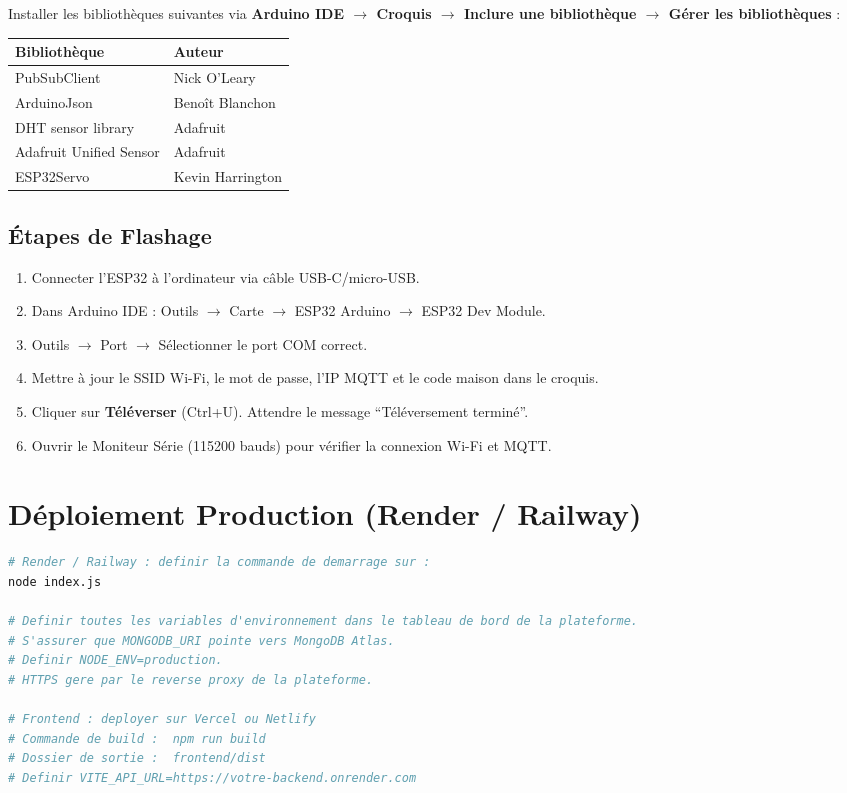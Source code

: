 Installer les bibliothèques suivantes via \textbf{Arduino IDE $\to$ Croquis $\to$
Inclure une bibliothèque $\to$ Gérer les bibliothèques} :

\begin{center}
\begin{tabular}{ll}
\toprule
\textbf{Bibliothèque} & \textbf{Auteur} \\
\midrule
PubSubClient            & Nick O'Leary \\
ArduinoJson             & Beno\^{i}t Blanchon \\
DHT sensor library      & Adafruit \\
Adafruit Unified Sensor & Adafruit \\
ESP32Servo              & Kevin Harrington \\
\bottomrule
\end{tabular}
\end{center}

\subsection{Étapes de Flashage}

\begin{enumerate}[leftmargin=1.5cm,itemsep=4pt]
  \item Connecter l'ESP32 à l'ordinateur via câble USB-C/micro-USB.
  \item Dans Arduino IDE : Outils $\to$ Carte $\to$ ESP32 Arduino $\to$ ESP32 Dev Module.
  \item Outils $\to$ Port $\to$ Sélectionner le port COM correct.
  \item Mettre à jour le SSID Wi-Fi, le mot de passe, l'IP MQTT et le code maison dans le croquis.
  \item Cliquer sur \textbf{Téléverser} (Ctrl+U). Attendre le message ``Téléversement terminé''.
  \item Ouvrir le Moniteur Série (115200 bauds) pour vérifier la connexion Wi-Fi et MQTT.
\end{enumerate}

\section{Déploiement Production (Render / Railway)}

\begin{lstlisting}[style=codeblock,language=bash,caption={Commande de D\'emarrage Production}]
# Render / Railway : definir la commande de demarrage sur :
node index.js

# Definir toutes les variables d'environnement dans le tableau de bord de la plateforme.
# S'assurer que MONGODB_URI pointe vers MongoDB Atlas.
# Definir NODE_ENV=production.
# HTTPS gere par le reverse proxy de la plateforme.

# Frontend : deployer sur Vercel ou Netlify
# Commande de build :  npm run build
# Dossier de sortie :  frontend/dist
# Definir VITE_API_URL=https://votre-backend.onrender.com
\end{lstlisting}

